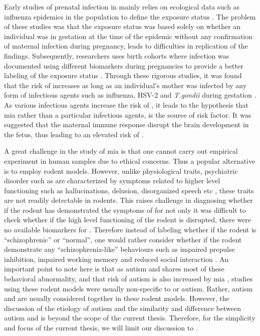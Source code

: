 	Early studies of prenatal infection in  mainly relies on ecological data such as influenza epidemics in the population to define the exposure status \citep{Brown2010}.
	The problem of these studies was that the exposure status was based solely on whether an individual was in gestation at the time of the epidemic without any confirmation of maternal infection during pregnancy, leads to difficulties in replication of the findings.
	Subsequently, researchers uses birth cohorts where infection was documented using different biomarkers during pregnancies to provide a better labeling of the exposure status \citep{Brown2010}.
	Through these rigorous studies, it was found that the risk of  increases as long as an individual's mother was infected by any form of infectious agents such as influenza, HSV-2 and \textit{T.gondii} during gestation \citep{Brown2010}.
	As various infectious agents increase the risk of , it leads to the hypothesis that \gls{mia} \citep{Brown2010} rather than a particular infectious agents, is the source of risk factor. 
	It was suggested that the maternal immune response disrupt the brain development in the fetus, thus leading to an elevated risk of  \citep{Garbett2012a}.
	
	A great challenge in the study of \gls{mia} is that one cannot carry out empirical experiment in human samples due to ethical concerns.
	Thus a popular alternative is to employ rodent models.
	However, unlike physiological traits, psychiatric disorder such as  are characterized by symptoms related to higher level functioning such as hallucinations, delusion, disorganized speech etc \citep{AmericanPsychiatricAssociation2013}, these traits are not readily detectable in rodents.
	This raises challenge in diagnosing whether if the rodent has demonstrated the symptoms of  for not only it was difficult to check whether if the high level functioning of the rodent is disrupted, there were no available biomarkers for .
	Therefore instead of labeling whether if the rodent is ``schizophrenic'' or ``normal'', one would rather consider whether if the rodent demonstrate any ``schizophrenia-like'' behaviours such as impaired prepulse inhibition, impaired working memory and reduced social interaction \citep{Meyer2007a}.
	An important point to note here is that as autism and  shares most of these behavioral abnormality, and that risk of autism is also increased by \gls{mia} \citep{Brown2012}, studies using these rodent models were usually non-specific to  or autism. 
	Rather, autism and  are usually considered together in these rodent models.
	However, the discussion of the etiology of autism and the similarity and difference between autism and  is beyond the scope of the current thesis.
	Therefore, for the simplicity and focus of the current thesis, we will limit our discussion to .
	
